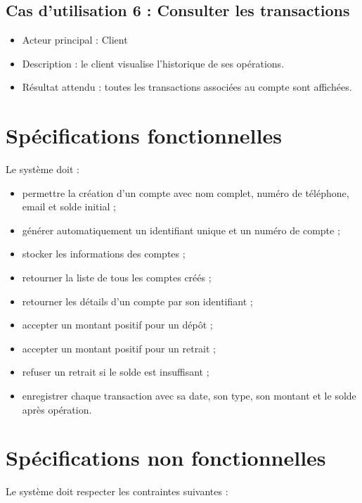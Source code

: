 \documentclass[12pt,a4paper]{article}
\begin{document}
\subsection{Cas d'utilisation 6 : Consulter les transactions}

\begin{itemize}
    \item Acteur principal : Client
    \item Description : le client visualise l'historique de ses opérations.
    \item Résultat attendu : toutes les transactions associées au compte sont affichées.
\end{itemize}

\section{Spécifications fonctionnelles}

Le système doit :

\begin{itemize}
    \item permettre la création d'un compte avec nom complet, numéro de téléphone, email et solde initial ;
    \item générer automatiquement un identifiant unique et un numéro de compte ;
    \item stocker les informations des comptes ;
    \item retourner la liste de tous les comptes créés ;
    \item retourner les détails d'un compte par son identifiant ;
    \item accepter un montant positif pour un dépôt ;
    \item accepter un montant positif pour un retrait ;
    \item refuser un retrait si le solde est insuffisant ;
    \item enregistrer chaque transaction avec sa date, son type, son montant et le solde après opération.
\end{itemize}

\section{Spécifications non fonctionnelles}

Le système doit respecter les contraintes suivantes :
\end{document}
